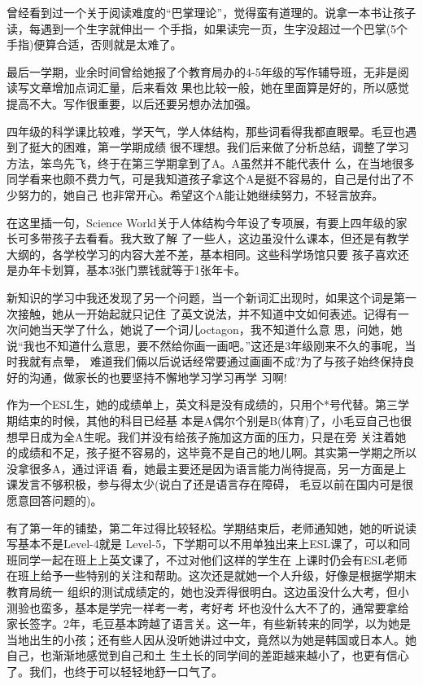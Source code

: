 \documentclass[11pt,a4paper,onecolumn]{article}
\begin{document}
曾经看到过一个关于阅读难度的``巴掌理论''，觉得蛮有道理的。说拿一本书让孩子读，每遇到一个生字就伸出一
个手指，如果读完一页，生字没超过一个巴掌(5个手指)便算合适，否则就是太难了。


最后一学期，业余时间曾给她报了个教育局办的4-5年级的写作辅导班，无非是阅读写文章增加点词汇量，后来看效
果也比较一般，她在里面算是好的，所以感觉提高不大。写作很重要，以后还要另想办法加强。


四年级的科学课比较难，学天气，学人体结构，那些词看得我都直眼晕。毛豆也遇到了挺大的困难，第一学期成绩
很不理想。我们后来做了分析总结，调整了学习方法，笨鸟先飞，终于在第三学期拿到了A。A虽然并不能代表什
么，在当地很多同学看来也颇不费力气，可是我知道孩子拿这个A是挺不容易的，自己是付出了不少努力的，她自己
也非常开心。希望这个A能让她继续努力，不轻言放弃。


在这里插一句，Science World关于人体结构今年设了专项展，有要上四年级的家长可多带孩子去看看。我大致了解
了一些人，这边虽没什么课本，但还是有教学大纲的，各学校学习的内容大差不差，基本相同。这些科学场馆只要
孩子喜欢还是办年卡划算，基本3张门票钱就等于1张年卡。


新知识的学习中我还发现了另一个问题，当一个新词汇出现时，如果这个词是第一次接触，她从一开始起就只记住
了英文说法，并不知道中文如何表述。记得有一次问她当天学了什么，她说了一个词儿octagon，我不知道什么意
思，问她，她说``我也不知道什么意思，要不然给你画一画吧。''这还是3年级刚来不久的事呢，当时我就有点晕，
难道我们倆以后说话经常要通过画画不成?为了与孩子始终保持良好的沟通，做家长的也要坚持不懈地学习学习再学
习啊!


作为一个ESL生，她的成绩单上，英文科是没有成绩的，只用个*号代替。第三学期结束的时候，其他的科目已经基
本是A偶尔个别是B(体育)了，小毛豆自己也很想早日成为全A生呢。我们并没有给孩子施加这方面的压力，只是在旁
关注着她的成绩和不足，孩子挺不容易的，这毕竟不是自己的地儿啊。其实第一学期之所以没拿很多A，通过评语
看，她最主要还是因为语言能力尚待提高，另一方面是上课发言不够积极，参与得太少(说白了还是语言存在障碍，
毛豆以前在国内可是很愿意回答问题的)。


有了第一年的铺垫，第二年过得比较轻松。学期结束后，老师通知她，她的听说读写基本不是Level-4就是
Level-5，下学期可以不用单独出来上ESL课了，可以和同班同学一起在班上上英文课了，不过对他们这样的学生在
上课时仍会有ESL老师在班上给予一些特别的关注和帮助。这次还是就她一个人升级，好像是根据学期末教育局统一
组织的测试成绩定的，她也没弄得很明白。这边虽没什么大考，但小测验也蛮多，基本是学完一样考一考，考好考
坏也没什么大不了的，通常要拿给家长签字。2年，毛豆基本跨越了语言关。这一年，有些新转来的同学，以为她是
当地出生的小孩；还有些人因从没听她讲过中文，竟然以为她是韩国或日本人。她自己，也渐渐地感觉到自己和土
生土长的同学间的差距越来越小了，也更有信心了。我们，也终于可以轻轻地舒一口气了。
\end{document}
